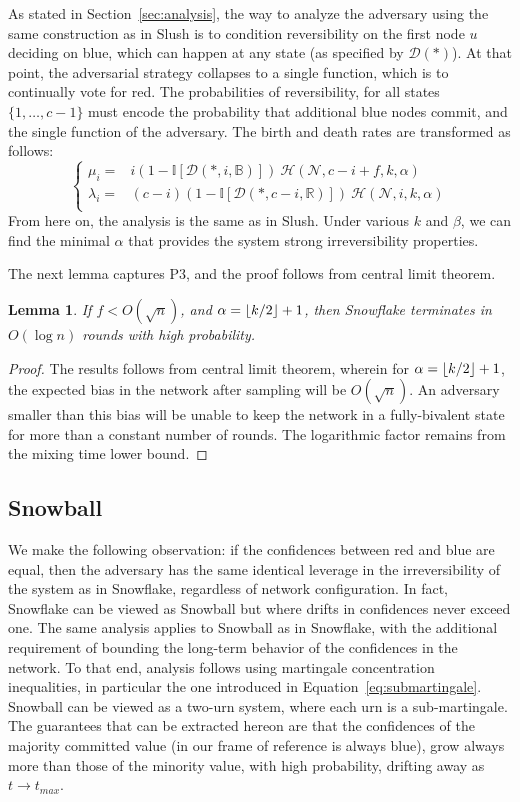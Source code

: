 \documentclass[letterpaper,twocolumn,10pt]{article}
\DeclarePairedDelimiter{\floor}{\lfloor}{\rfloor}
\newcommand{\Oh}[1]{O(#1)}
\newtheorem{lemma}[theorem]{Lemma}
\theoremstyle{definition}
\begin{document}
\begin{appendices}
As stated in Section~\ref{sec:analysis}, the way to analyze the adversary using the same construction as in Slush is to condition reversibility on the first node $u$ deciding on blue, which can happen at any state (as specified by $\mathcal{D}(*)$). At that point, the adversarial strategy collapses to a single function, which is to continually vote for red. The probabilities of reversibility, for all states $\{1, \dots, c-1\}$ must encode the probability that additional blue nodes commit, and the single function of the adversary. The birth and death rates are transformed as follows:
\[
    \begin{cases}
        \mu_i = &i(1 - \mathbb{I}[\mathcal{D}(*, i, \mathbb{B})])\ \mathcal{H}(\mathcal{N}, c-i + f, k, \alpha)\\
        \lambda_i = &(c-i)(1 - \mathbb{I}[\mathcal{D}(*, c-i, \mathbb{R})])\ \mathcal{H}(\mathcal{N}, i, k, \alpha)\\
    \end{cases}
\]
From here on, the analysis is the same as in Slush. Under various $k$ and $\beta$, we can find the minimal $\alpha$ that provides the system strong irreversibility properties. 

The next lemma captures P3, and the proof follows from central limit theorem. 
\begin{lemma}
If $f < \Oh{\sqrt{n}}$, and $\alpha = \floor{k/2} + 1$, then Snowflake terminates in $\Oh{\log n}$ rounds with high probability. 
\label{lemma:centrallimit}
\end{lemma}
\begin{proof}
The results follows from central limit theorem, wherein for $\alpha = \floor{k/2} + 1$, the expected bias in the network after sampling will be $\Oh{\sqrt{n}}$. An adversary smaller than this bias will be unable to keep the network in a fully-bivalent state for more than a constant number of rounds. The logarithmic factor remains from the mixing time lower bound. 
\end{proof}

\subsection{Snowball}
We make the following observation: if the confidences between red and blue are equal, then the adversary has the same identical leverage in the irreversibility of the system as in Snowflake, regardless of network configuration. In fact, Snowflake can be viewed as Snowball but where drifts in confidences never exceed one. The same analysis applies to Snowball as in Snowflake, with the additional requirement of bounding the long-term behavior of the confidences in the network. To that end, analysis follows using martingale concentration inequalities, in particular the one introduced in Equation~\ref{eq:submartingale}. Snowball can be viewed as a two-urn system, where each urn is a sub-martingale. The guarantees that can be extracted hereon are that the confidences of the majority committed value (in our frame of reference is always blue), grow always more than those of the minority value, with high probability, drifting away as $t \rightarrow t_{max}$. 

\end{appendices}
\end{document}

